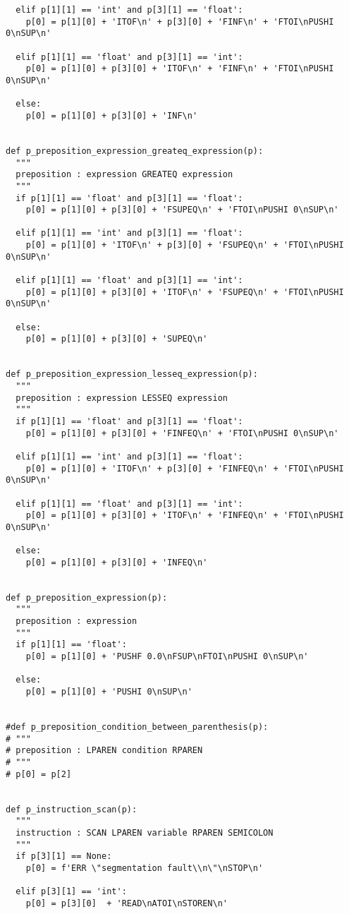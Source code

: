 \documentclass[11pt,a4paper]{report}%
\begin{document}
\begin{scriptsize}
\begin{verbatim}
  elif p[1][1] == 'int' and p[3][1] == 'float':
    p[0] = p[1][0] + 'ITOF\n' + p[3][0] + 'FINF\n' + 'FTOI\nPUSHI 0\nSUP\n'
  
  elif p[1][1] == 'float' and p[3][1] == 'int':
    p[0] = p[1][0] + p[3][0] + 'ITOF\n' + 'FINF\n' + 'FTOI\nPUSHI 0\nSUP\n'

  else:
    p[0] = p[1][0] + p[3][0] + 'INF\n'


def p_preposition_expression_greateq_expression(p):
  """
  preposition : expression GREATEQ expression
  """
  if p[1][1] == 'float' and p[3][1] == 'float':
    p[0] = p[1][0] + p[3][0] + 'FSUPEQ\n' + 'FTOI\nPUSHI 0\nSUP\n'

  elif p[1][1] == 'int' and p[3][1] == 'float':
    p[0] = p[1][0] + 'ITOF\n' + p[3][0] + 'FSUPEQ\n' + 'FTOI\nPUSHI 0\nSUP\n'
  
  elif p[1][1] == 'float' and p[3][1] == 'int':
    p[0] = p[1][0] + p[3][0] + 'ITOF\n' + 'FSUPEQ\n' + 'FTOI\nPUSHI 0\nSUP\n'

  else:
    p[0] = p[1][0] + p[3][0] + 'SUPEQ\n'


def p_preposition_expression_lesseq_expression(p):
  """
  preposition : expression LESSEQ expression
  """
  if p[1][1] == 'float' and p[3][1] == 'float':
    p[0] = p[1][0] + p[3][0] + 'FINFEQ\n' + 'FTOI\nPUSHI 0\nSUP\n'

  elif p[1][1] == 'int' and p[3][1] == 'float':
    p[0] = p[1][0] + 'ITOF\n' + p[3][0] + 'FINFEQ\n' + 'FTOI\nPUSHI 0\nSUP\n'
  
  elif p[1][1] == 'float' and p[3][1] == 'int':
    p[0] = p[1][0] + p[3][0] + 'ITOF\n' + 'FINFEQ\n' + 'FTOI\nPUSHI 0\nSUP\n'

  else:
    p[0] = p[1][0] + p[3][0] + 'INFEQ\n'


def p_preposition_expression(p):
  """
  preposition : expression
  """
  if p[1][1] == 'float':
    p[0] = p[1][0] + 'PUSHF 0.0\nFSUP\nFTOI\nPUSHI 0\nSUP\n'
  
  else:
    p[0] = p[1][0] + 'PUSHI 0\nSUP\n'


#def p_preposition_condition_between_parenthesis(p):
# """
# preposition : LPAREN condition RPAREN
# """
# p[0] = p[2]


def p_instruction_scan(p):
  """
  instruction : SCAN LPAREN variable RPAREN SEMICOLON
  """
  if p[3][1] == None:
    p[0] = f'ERR \"segmentation fault\\n\"\nSTOP\n'
  
  elif p[3][1] == 'int':
    p[0] = p[3][0]  + 'READ\nATOI\nSTOREN\n'
  

\end{verbatim}
\end{scriptsize}
\end{document}
